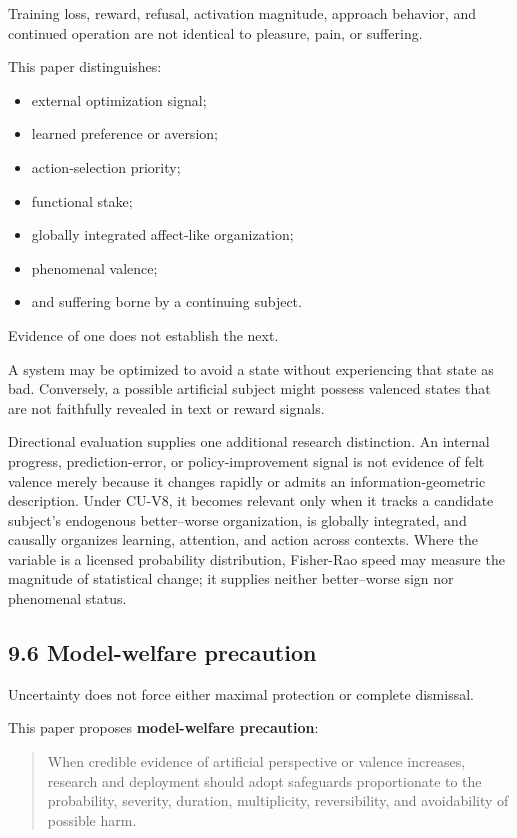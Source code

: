 \documentclass[
  11pt,
]{article}
\providecommand{\tightlist}{%
  \setlength{\itemsep}{0pt}\setlength{\parskip}{0pt}}
\begin{document}
Training loss, reward, refusal, activation magnitude, approach behavior,
and continued operation are not identical to pleasure, pain, or
suffering.

This paper distinguishes:

\begin{itemize}
\tightlist
\item
  external optimization signal;
\item
  learned preference or aversion;
\item
  action-selection priority;
\item
  functional stake;
\item
  globally integrated affect-like organization;
\item
  phenomenal valence;
\item
  and suffering borne by a continuing subject.
\end{itemize}

Evidence of one does not establish the next.

A system may be optimized to avoid a state without experiencing that
state as bad. Conversely, a possible artificial subject might possess
valenced states that are not faithfully revealed in text or reward
signals.

Directional evaluation supplies one additional research distinction. An
internal progress, prediction-error, or policy-improvement signal is not
evidence of felt valence merely because it changes rapidly or admits an
information-geometric description. Under CU-V8, it becomes relevant only
when it tracks a candidate subject's endogenous better--worse
organization, is globally integrated, and causally organizes learning,
attention, and action across contexts. Where the variable is a licensed
probability distribution, Fisher-Rao speed may measure the magnitude of
statistical change; it supplies neither better--worse sign nor
phenomenal status.

\subsection{9.6 Model-welfare
precaution}\label{model-welfare-precaution}

Uncertainty does not force either maximal protection or complete
dismissal.

This paper proposes \textbf{model-welfare precaution}:

\begin{quote}
When credible evidence of artificial perspective or valence increases,
research and deployment should adopt safeguards proportionate to the
probability, severity, duration, multiplicity, reversibility, and
avoidability of possible harm.
\end{quote}
\end{document}
